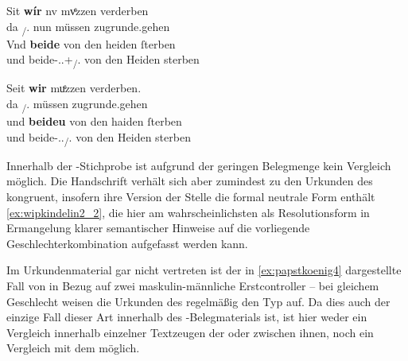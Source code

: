 \begin{exe}
\ex \label{ex:wipkindelin2}
	\begin{xlist}
	\ex \label{ex:wipkindelin2_1}
		\begin{taggedline}{\parencite[\pno~5\rb, 33--34]{kc:VB}}
		\gll Sit \textbf{wír} nv mvͤzzen verderben \\
			da \Fpl\textsubscript{\SF/\SX}.\Nom{} nun müssen zugrunde.gehen \\
	\sn \gll Vnd \textbf{beide} von den heiden ſterben \\
			und beide-\Nom.\Pl.\M+\F\textsubscript{\SF/\SX}.\St{} von den Heiden
				sterben \\
		\end{taggedline}
		
	\ex \label{ex:wipkindelin2_2}
		\gll Seit \textbf{wir} muͤzzen verderben. \\
			da \Fpl\textsubscript{\SF/\SX}.\Nom{} müssen zugrunde.gehen \\
	\sn \gll und \textbf{beideu} von den haiden ſterben \\
			und beide-\Nom.\Pl.\N\textsubscript{\SF/\SX}.\St{} von den Heiden
				sterben \\
		\begin{taggedline}{\parencites[\pno~4\vb, 57--58]{kc:B1}[vgl. abweichend][931--932]{schroeder1895}}
		\trans {}
		\end{taggedline}
	\end{xlist}
\end{exe}

Innerhalb der \KC{}-Stichprobe ist aufgrund der geringen Belegmenge
kein Vergleich möglich. Die Handschrift \citet{kc:B1} verhält sich aber
zumindest zu den Urkunden des \CAO{} kongruent, insofern ihre Version
der Stelle die formal neutrale Form  enthält
\cref{ex:wipkindelin2_2}, die hier am wahrscheinlichsten als Resolutionsform in
Ermangelung klarer semantischer Hinweise auf die vorliegende
Geschlechterkombination aufgefasst werden kann.

Im Urkundenmaterial gar nicht vertreten ist der in \cref{ex:papstkoenig4}
dargestellte Fall von  in Bezug auf zwei maskulin-männliche
Erstcontroller -- bei gleichem Geschlecht weisen die Urkunden des
\CAO{} regelmäßig den Typ  auf. Da dies auch der einzige
Fall dieser Art innerhalb des \KC{}-Belegmaterials ist, ist hier weder
ein Vergleich innerhalb einzelner Textzeugen der \KC{} oder zwischen
ihnen, noch ein Vergleich mit dem \CAO{} möglich.

